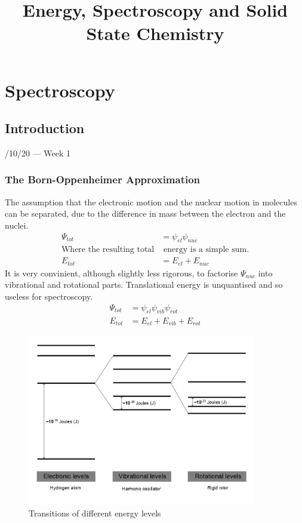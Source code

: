 \documentclass{article}
\title{Energy, Spectroscopy and Solid State Chemistry}
\date{}
\author{}
\newcommand{\thedate}[1]{\hfill{\small\sc #1}}
\begin{document}
    \maketitle
    \section{Spectroscopy}
    \subsection{Introduction}\thedate{28/10/20 --- Week 1}
    \subsubsection{The Born-Oppenheimer Approximation}
    The assumption that the electronic motion and the nuclear motion in molecules can be separated, due to the
    difference in mass between the electron and the nuclei.
    \begin{align*}
        \Psi_{tot} &= \psi_{el} \psi_{nuc}\\
        \text{Where the resulting total} & \text{ energy is a simple sum.}\\
        E_{tot} &= E_{el} + E_{nuc}
    \end{align*}
    It is very convinient, although slightly less rigorous, to factorise \(\Psi_{nuc}\) into vibrational and
    rotational parts. Translational energy is unquantised and so useless for spectroscopy.
    \begin{align*}
        \Psi_{tot} &= \psi_{el} \psi_{vib} \psi_{rot}\\
        E_{tot} &= E_{el} + E_{vib} + E_{rot}
    \end{align*}
    \begin{figure}[h]
        \centering
        \includegraphics[width=10cm]{trans.png}
        \caption{Transitions of different energy levels}
    \end{figure}
\end{document}
